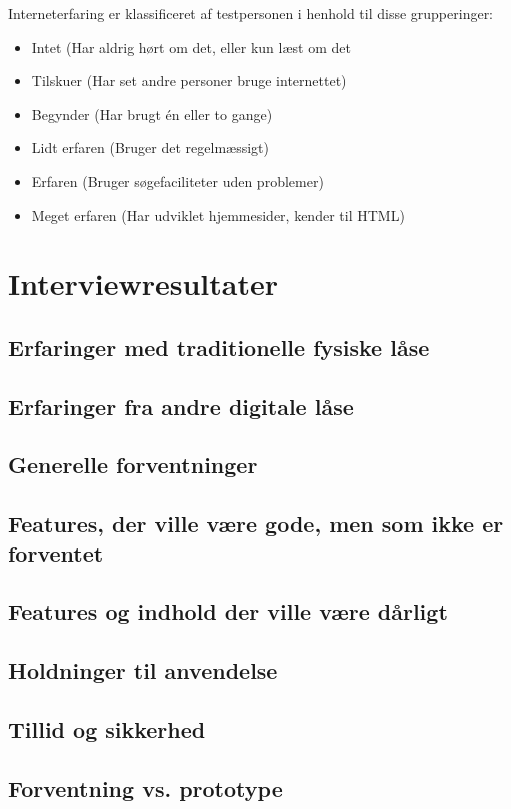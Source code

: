 \documentclass[a4paper,12pt]{article}
\begin{document}
Interneterfaring er klassificeret af testpersonen i henhold til disse grupperinger:
\begin{itemize}


\item Intet (Har aldrig hørt om det, eller kun læst om det 
\item Tilskuer (Har set andre personer bruge internettet)  
\item Begynder (Har brugt én eller to gange)
\item Lidt erfaren (Bruger det regelmæssigt)
\item Erfaren (Bruger søgefaciliteter uden problemer)
\item Meget erfaren (Har udviklet hjemmesider, kender til HTML)

\end{itemize}

\section{Interviewresultater}
\subsection{Erfaringer med traditionelle fysiske låse}
\subsection{Erfaringer fra andre digitale låse}
\subsection{Generelle forventninger}
\subsection{Features, der ville være gode, men som ikke er forventet}
\subsection{Features og indhold der ville være dårligt}
\subsection{Holdninger til anvendelse}
\subsection{Tillid og sikkerhed}
\subsection{Forventning vs. prototype}
\end{document}
